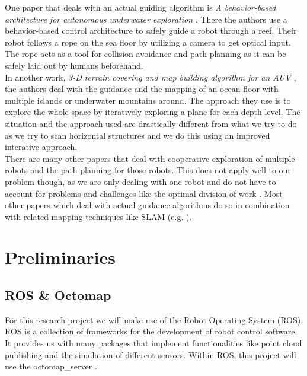 \documentclass[twoside, 12pt]{article}
\begin{document}
One paper that deals with an actual guiding algorithm is \textit{A behavior-based architecture for autonomous underwater exploration} \cite{rosenblatt2002behavior}. There the authors use a behavior-based control architecture to safely guide a robot through a reef. Their robot follows a rope on the sea floor by utilizing a camera to get optical input. The rope acts as a tool for collision avoidance and path planning as it can be safely laid out by humans beforehand.\\

In another work, \textit{3-D terrain covering and map building algorithm for an AUV} \cite{lee20093}, the authors deal with the guidance and the mapping of an ocean floor with multiple islands or underwater mountains around. The approach they use is to explore the whole space by iteratively exploring a plane for each depth level. The situation and the approach used are drastically different from what we try to do as we try to scan horizontal structures and we do this using an improved interative approach.\\

There are many other papers that deal with cooperative exploration of multiple robots and the path planning for those robots. This does not apply well to our problem though, as we are only dealing with one robot and do not have to account for problems and challenges like the optimal division of work \cite{wu2012robust}. Most other papers which deal with actual guidance algorithms do so in combination with related mapping techniques like SLAM (e.g. \cite{makarenko2002experiment}).\\
  
\section{Preliminaries}
\label{sec:preliminaries}

\subsection{ROS \& Octomap}
For this research project we will make use of the Robot Operating System (ROS). ROS is a collection of frameworks for the development of robot control software. It provides us with many packages that implement functionalities like point cloud publishing and the simulation of different sensors. Within ROS, this project will use the octomap\_server \cite{hornung13auro}.\\
\end{document}
